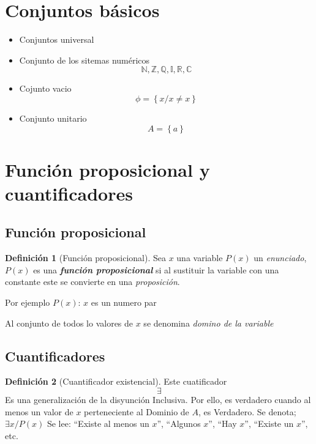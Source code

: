 \documentclass[
  16pt,
]{krantz}
\theoremstyle{definition}
\newtheorem{definition}{Definición}[chapter]
\theoremstyle{definition}
\theoremstyle{definition}
\theoremstyle{definition}
\theoremstyle{remark}
\begin{document}
\hypertarget{conjuntos-buxe1sicos}{%
\section{Conjuntos básicos}\label{conjuntos-buxe1sicos}}

\begin{itemize}
\item
  Conjuntos universal
\item
  Conjunto de los sitemas numéricos
  \[
  \mathbb{N}, \mathbb{Z}, \mathbb{Q}, \mathbb{I}, \mathbb{R}, \mathbb{C}
  \]
\item
  Cojunto vacio
  \[
  \phi=\left\{x/x\neq x\right\}
  \]
\item
  Conjunto unitario
  \[
  A=\left\{a\right\}
  \]
\end{itemize}

\hypertarget{funciuxf3n-proposicional-y-cuantificadores}{%
\section{Función proposicional y cuantificadores}\label{funciuxf3n-proposicional-y-cuantificadores}}

\hypertarget{funciuxf3n-proposicional}{%
\subsection{Función proposicional}\label{funciuxf3n-proposicional}}

\begin{definition}[Función proposicional]
\protect\hypertarget{def:proposicional}{}\label{def:proposicional}Sea \(x\) una variable \(P(x)\) un \emph{enunciado}, \(P(x)\) es una \textbf{\emph{función proposicional}} si al sustituir la variable con una constante este se convierte en una \emph{proposición}.
\end{definition}

Por ejemplo \(P(x)\): \(x\) es un numero par

Al conjunto de todos lo valores de \(x\) se denomina \emph{domino de la variable}

\hypertarget{cuantificadores}{%
\subsection{Cuantificadores}\label{cuantificadores}}

\begin{definition}[Cuantificador existencial]
\protect\hypertarget{def:existencial}{}\label{def:existencial}Este cuatificador
\[\exists\]
Es una generalización de la disyunción Inclusiva. Por ello, es verdadero cuando al menos un valor de \(x\) perteneciente al Dominio de \(A\), es Verdadero. Se denota; \(\exists x / P (x)\) Se lee: ``Existe al menos un \(x\)'', ``Algunos \(x\)'', ``Hay \(x\)'', ``Existe un \(x\)'', etc.
\end{definition}
\end{document}
